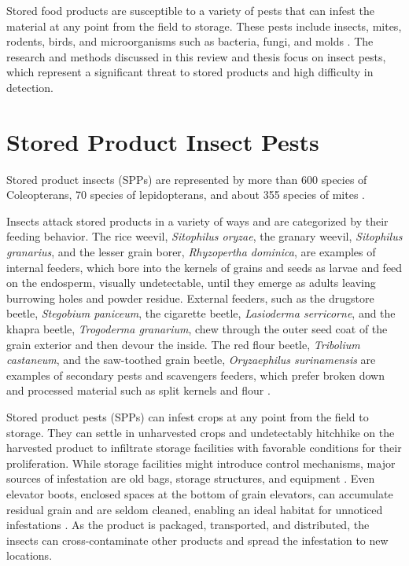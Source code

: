 \documentclass[../Vibro-Acoustic Signatures and Detection Algorithms for Stored Product Insects.tex]{subfiles}
\begin{document}
Stored food products are susceptible to a variety of pests that can infest the material at any point from the field to storage. These pests include insects, mites, rodents, birds, and microorganisms such as bacteria, fungi, and molds \cite{devipriyar.InsectPestDetection2022}. The research and methods discussed in this review and thesis focus on insect pests, which represent a significant threat to stored products and high difficulty in detection.

\newpage
\section{Stored Product Insect Pests}

Stored product insects (SPPs) are represented by more than 600 species of Coleopterans, 70 species of lepidopterans, and about 355 species of mites \cite{tyagiPostHarvestStoredProduct2019}.

Insects attack stored products in a variety of ways and are categorized by their feeding behavior. The rice weevil, \textit{Sitophilus oryzae}, the granary weevil, \textit{Sitophilus granarius}, and the lesser grain borer, \textit{Rhyzopertha dominica}, are examples of internal feeders, which bore into the kernels of grains and seeds as larvae and feed on the endosperm, visually undetectable, until they emerge as adults leaving burrowing holes and powder residue. External feeders, such as the drugstore beetle, \textit{Stegobium paniceum}, the cigarette beetle, \textit{Lasioderma serricorne}, and the khapra beetle, \textit{Trogoderma granarium}, chew through the outer seed coat of the grain exterior and then devour the inside. The red flour beetle, \textit{Tribolium castaneum}, and the saw-toothed grain beetle, \textit{Oryzaephilus surinamensis} are examples of secondary pests and scavengers feeders, which prefer broken down and processed material such as split kernels and flour \cite{bennettTrumansScientificGuide1988}.

Stored product pests (SPPs) can infest crops at any point from the field to storage. They can settle in unharvested crops and undetectably hitchhike on the harvested product to infiltrate storage facilities with favorable conditions for their proliferation. While storage facilities might introduce control mechanisms, major sources of infestation are old bags, storage structures, and equipment \cite{tyagiPostHarvestStoredProduct2019}. Even elevator boots, enclosed spaces at the bottom of grain elevators, can accumulate residual grain and are seldom cleaned, enabling an ideal habitat for unnoticed infestations \cite{tilleyStoredgrainInsectPopulation2014}. As the product is packaged, transported, and distributed, the insects can cross-contaminate other products and spread the infestation to new locations.
\end{document}
